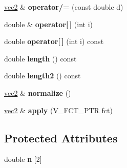 \begin{DoxyCompactItemize}
\item 
\hypertarget{classvec2_af0a1174b7d6a2cbba15d3488b9aacb5f}{
\hyperlink{classvec2}{vec2} \& {\bfseries operator/=} (const double d)}
\label{classvec2_af0a1174b7d6a2cbba15d3488b9aacb5f}

\item 
\hypertarget{classvec2_ab599f3207691a6d36ef50e3a4b3bbf76}{
double \& {\bfseries operator\mbox{[}$\,$\mbox{]}} (int i)}
\label{classvec2_ab599f3207691a6d36ef50e3a4b3bbf76}

\item 
\hypertarget{classvec2_a54459bcef2c1088736b623aff9b972a5}{
double {\bfseries operator\mbox{[}$\,$\mbox{]}} (int i) const }
\label{classvec2_a54459bcef2c1088736b623aff9b972a5}

\item 
\hypertarget{classvec2_ab987bfbdfa5ec6b8333c8e2fb7ea1fc4}{
double {\bfseries length} () const }
\label{classvec2_ab987bfbdfa5ec6b8333c8e2fb7ea1fc4}

\item 
\hypertarget{classvec2_a4e7d048bc791da7d345c0180fca2a235}{
double {\bfseries length2} () const }
\label{classvec2_a4e7d048bc791da7d345c0180fca2a235}

\item 
\hypertarget{classvec2_a2aa2180a727a575f4844ce5c878a5f55}{
\hyperlink{classvec2}{vec2} \& {\bfseries normalize} ()}
\label{classvec2_a2aa2180a727a575f4844ce5c878a5f55}

\item 
\hypertarget{classvec2_a83760a59314805cdebf8d5bc87253944}{
\hyperlink{classvec2}{vec2} \& {\bfseries apply} (V\_\-FCT\_\-PTR fct)}
\label{classvec2_a83760a59314805cdebf8d5bc87253944}

\end{DoxyCompactItemize}
\subsection*{Protected Attributes}
\begin{DoxyCompactItemize}
\item 
\hypertarget{classvec2_acaf95d396e8d9be9159b0d8293cfcc9c}{
double {\bfseries n} \mbox{[}2\mbox{]}}
\label{classvec2_acaf95d396e8d9be9159b0d8293cfcc9c}

\end{DoxyCompactItemize}
